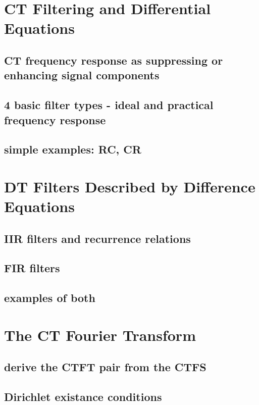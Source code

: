 \documentclass{article}
\begin{document}
\section{CT Filtering and Differential Equations}
\label{sec:orgf36132d}
\subsection{CT frequency response as suppressing or enhancing signal components}
\label{sec:org6a27264}
\subsection{4 basic filter types - ideal and practical frequency response}
\label{sec:orgb1ed6ac}
\subsection{simple examples: RC, CR}
\label{sec:org0734828}
\section{DT Filters Described by Difference Equations}
\label{sec:org2b6b730}
\subsection{IIR filters and recurrence relations}
\label{sec:org928ff1a}

\subsection{FIR filters}
\label{sec:org15ab380}

\subsection{examples of both}
\label{sec:orgbb45d7e}

\section{The CT Fourier Transform}
\label{sec:org76eb4f9}

\subsection{derive the CTFT pair from the CTFS}
\label{sec:orgdf07b5a}

\subsection{Dirichlet existance conditions}
\label{sec:org6311427}
\end{document}

